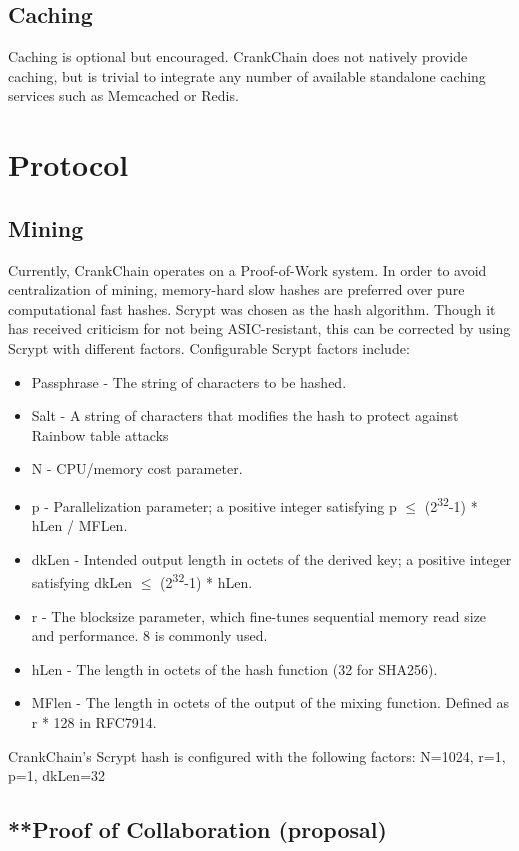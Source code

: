 \documentclass[10pt,twocolumn]{article}
\begin{document}
\subsection{Caching}
Caching is optional but encouraged.  CrankChain does not natively provide caching, but is trivial to integrate any number of available standalone caching services such as Memcached or Redis.  


\section{Protocol}
\subsection{Mining}
Currently, CrankChain operates on a Proof-of-Work system.  In order to avoid centralization of mining, memory-hard slow hashes are preferred over pure computational fast hashes. Scrypt was chosen as the hash algorithm.  Though it has received criticism for not being ASIC-resistant, this can be corrected by using Scrypt with different factors.  Configurable Scrypt factors include:
\begin{itemize}
\item Passphrase - The string of characters to be hashed.
\item Salt - A string of characters that modifies the hash to protect against Rainbow table attacks
\item N - CPU/memory cost parameter.
\item p - Parallelization parameter; a positive integer satisfying p $\leq$ (2\textsuperscript{32}-1) * hLen / MFLen.
\item dkLen - Intended output length in octets of the derived key; a positive integer satisfying dkLen $\leq$ (2\textsuperscript{32}-1) * hLen.
\item r - The blocksize parameter, which fine-tunes sequential memory read size and performance. 8 is commonly used.
\item hLen - The length in octets of the hash function (32 for SHA256).
\item MFlen - The length in octets of the output of the mixing function. Defined as r * 128 in RFC7914.
\end{itemize}
 CrankChain's Scrypt hash is configured with the following factors: N=1024, r=1, p=1, dkLen=32
\subsection{**Proof of Collaboration (proposal)}
\end{document}
